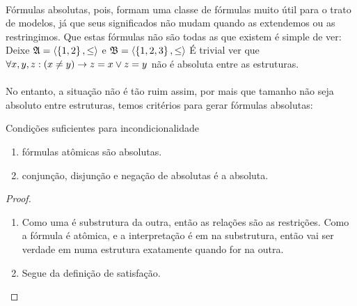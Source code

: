             \paragraph{}
                Fórmulas absolutas, pois, formam uma classe de fórmulas muito útil para o trato
                de modelos, já que seus significados não mudam quando as extendemos ou as
                restringimos. Que estas fórmulas não são todas as que existem é simple de ver:
                Deixe
                $\mathfrak{A} = \TUPLE{\SET{1}{2}}{\leq}$  e
                $\mathfrak{B} = \TUPLE{\SET{1}{2}{3}}{\leq}$
                É trivial ver que $\forall x,y,z: (x\not= y)\rightarrow z=x\lor z=y$ 
                não é absoluta entre as estruturas.
            \paragraph{}
                No entanto, a situação não é tão ruim assim, por mais que tamanho não 
                seja absoluto entre estruturas, temos critérios para gerar fórmulas 
                absolutas:
            \begin{proposition}{Condições suficientes para incondicionalidade}
                \begin{enumerate}[label=\alph*)]
                    \item fórmulas atômicas são absolutas.
                    \item conjunção, disjunção e negação de absolutas é a absoluta.
                \end{enumerate}
                \begin{proof}
                    \begin{enumerate}[label=\alph*)]
                        \item 
                            Como uma é substrutura da outra, então as relações são as 
                            restrições. Como a fórmula é atômica, e a interpretação é 
                            em na substrutura, então vai ser verdade em numa estrutura
                            exatamente quando for na outra.
                        \item 
                            Segue da definição de satisfação.
                    \end{enumerate}
                \end{proof}
            \end{proposition}
